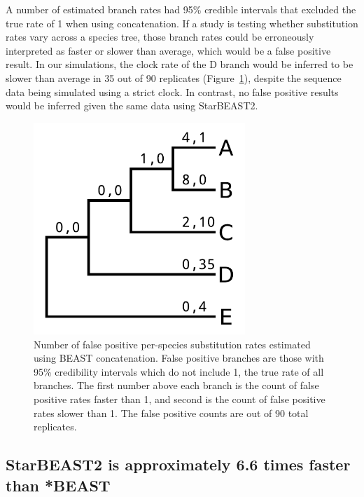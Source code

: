 \documentclass[12pt]{article}
\begin{document}
A number of estimated branch rates had 95\% credible intervals that excluded the
true rate of 1 when using concatenation. If a study is testing whether substitution rates
vary across a species tree, those branch rates could be erroneously interpreted as faster
or slower than average, which would be a false positive result. In our simulations, the
clock rate of the D branch would be inferred to be slower than average in 35
out of 90 replicates (Figure~\ref{fig:spilsFalsePositives}),
despite the sequence data being simulated using a strict clock. In contrast, no false
positive results would be inferred given the same data using StarBEAST2.

\begin{figure}[htb!]
\centering
\includegraphics[width=8cm]{false_positives.pdf}
\caption
{Number of false positive per-species substitution rates estimated using BEAST concatenation. False positive
branches are those with 95\% credibility intervals which do not include 1, the
true rate of all branches. The first number above each branch is the count of
false positive rates faster than 1, and second is the count of false positive
rates slower than 1. The false positive counts are out of 90 total replicates.}
\label{fig:spilsFalsePositives}
\end{figure}

\subsection{StarBEAST2 is approximately 6.6 times faster than *BEAST}
\end{document}
